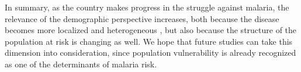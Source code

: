 \documentclass[
  12pt,
]{article}
\begin{document}
In summary, as the country makes progress in the struggle against malaria, the relevance of the demographic perspective increases, both because the disease becomes more localized and heterogeneous \citep{lanaTopQuantifyingUnequal2021}, but also because the structure of the population at risk is changing as well. We hope that future studies can take this dimension into consideration, since population vulnerability is already recognized as one of the determinants of malaria risk.

  
\end{document}
